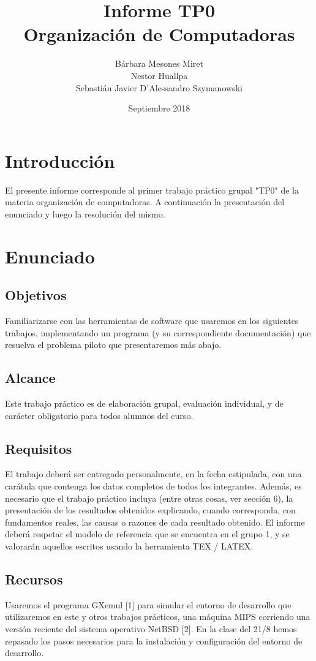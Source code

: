 \documentclass{article}
\title{Informe TP0\\
\large Organización de Computadoras}
\author{Bárbara Mesones Miret\\
Nestor Huallpa\\
Sebastián Javier D'Alessandro Szymanowski}
\date{Septiembre 2018}
\begin{document}
\maketitle

\section{Introducción}

El presente informe corresponde al primer trabajo práctico grupal "TP0" de la materia organización de computadoras.
A continuación la presentación del enunciado y luego la resolución del mismo.

\section{Enunciado}


\subsection{Objetivos}
Familiarizarse con las herramientas de software que usaremos en los siguientes trabajos, implementando un programa (y su correspondiente documentación) que resuelva el problema piloto que presentaremos más abajo.

\subsection{Alcance}
Este trabajo práctico es de elaboración grupal, evaluación individual, y de
carácter obligatorio para todos alumnos del curso.

\subsection{Requisitos}
El trabajo deberá ser entregado personalmente, en la fecha estipulada, con
una carátula que contenga los datos completos de todos los integrantes.
Además, es necesario que el trabajo práctico incluya (entre otras cosas, ver
sección 6), la presentación de los resultados obtenidos explicando, cuando corresponda, con fundamentos reales, las causas o razones de cada resultado obtenido.
El informe deberá respetar el modelo de referencia que se encuentra en el
grupo 1, y se valorarán aquellos escritos usando la herramienta TEX / LATEX.

\subsection{Recursos}
Usaremos el programa GXemul [1] para simular el entorno de desarrollo que
utilizaremos en este y otros trabajos prácticos, una máquina MIPS corriendo
una versión reciente del sistema operativo NetBSD [2].
En la clase del 21/8 hemos repasado los pasos necesarios para la instalación
y configuración del entorno de desarrollo.
\end{document}
